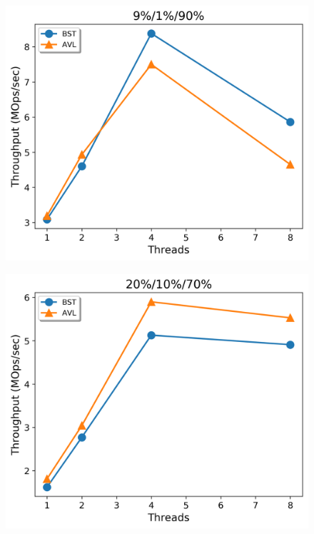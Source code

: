 \documentclass[conference]{IEEEtran}
\theoremstyle{definition}
\theoremstyle{theorem}
\begin{document}
\begin{figure}[t]
\begin{minipage}{0.33\textwidth}
 {\includegraphics[width =1\linewidth]{figures/stm2-9-1-90.png}}
\end{minipage}%
\begin{minipage}{0.33\textwidth}
 {\includegraphics[width =1\linewidth]{figures/conc-20-10-70.png}}

\end{minipage}
\end{figure}
\end{document}
